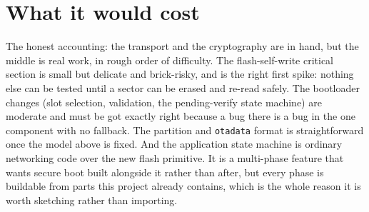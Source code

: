 \section{What it would cost}

The honest accounting: the transport and the cryptography are in hand, but the
middle is real work, in rough order of difficulty. The flash-self-write critical
section is small but delicate and brick-risky, and is the right first spike:
nothing else can be tested until a sector can be erased and re-read safely. The
bootloader changes (slot selection, validation, the pending-verify state machine)
are moderate and must be got exactly right because a bug there is a bug in the one
component with no fallback. The partition and \texttt{otadata} format is
straightforward once the model above is fixed. And the application state machine is
ordinary networking code over the new flash primitive. It is a multi-phase feature
that wants secure boot built alongside it rather than after, but every phase is
buildable from parts this project already contains, which is the whole reason it is
worth sketching rather than importing.
